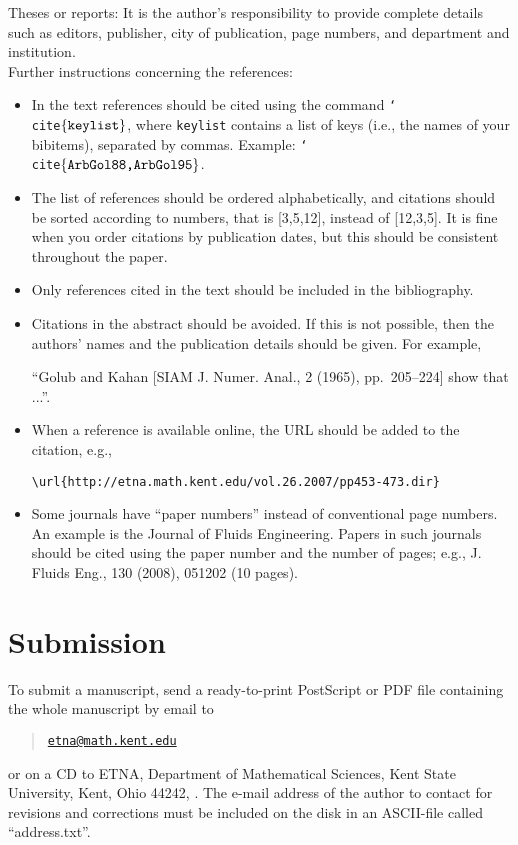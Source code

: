\documentclass{scrartcl}
\begin{document}
\noindent Theses or reports: It is the author's responsibility to provide
complete details such as editors, publisher, city of publication, page numbers,
and department and institution.\\

\noindent Further instructions concerning the references:

\begin{itemize}
\item In the text references should be cited using the command
  \texttt{\char`\\cite$\{\mbox{\texttt{keylist}}\}$},
where \texttt{keylist} contains a list of keys (i.e., the names of your bibitems),
separated by commas. Example:
\texttt{\char`\\cite$\{\mbox{\texttt{ArbGol88,ArbGol95}}\}$}.
%
\item The list of references should be ordered alphabetically, and
citations should be sorted according to numbers, that is [3,5,12],
instead of [12,3,5]. It is fine when you order citations by publication
dates, but this should be consistent throughout the paper.
%
\item Only references cited in the text should be included in the bibliography.
%
\item Citations in the abstract should be avoided. If this is not possible,
then the authors' names and the publication details should be given. For example,

``Golub and Kahan [SIAM J. Numer. Anal., 2 (1965), pp.~205--224] show that ...''.

\item When a reference is available online, the URL should be added to the
  citation, e.g.,
%
\begin{verbatim}
\url{http://etna.math.kent.edu/vol.26.2007/pp453-473.dir}
\end{verbatim}

\item Some journals have ``paper numbers'' instead of conventional page
  numbers.  An example is the Journal of Fluids Engineering. Papers in such
  journals should be cited using the paper number and the number of pages;
  e.g., J. Fluids Eng., 130 (2008), 051202 (10 pages).


\end{itemize}


\section{Submission}
To submit a manuscript, send a ready-to-print PostScript or PDF file containing
the whole manuscript by email to
\begin{quote}
    \href{mailto:etna@math.kent.edu}{\nolinkurl{etna@math.kent.edu}}
\end{quote}
or on a CD to ETNA, Department of Mathematical Sciences, Kent State University,
Kent, Ohio 44242, \@USA. The e-mail address of the author to contact for
revisions and corrections must be included on the disk in an ASCII-file called
``address.txt''.
\end{document}
